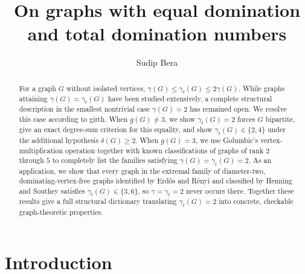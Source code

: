 \documentclass[12pt]{amsart}
\title{}
\theoremstyle{plain}
\newtheorem{theorem}{Theorem}[section]
\theoremstyle{definition}
\begin{document}
\title[On graphs with equal domination and total domination numbers]{On graphs with equal domination and total domination numbers}
\author[Sudip Bera]{Sudip Bera}
\address[Sudip Bera]{Faculty of Mathematics, Dhirubhai Ambani University, 
Gandhinagar, Gujarat, India}





\begin{abstract}
For a graph $G$ without isolated vertices, $\gamma(G)\le\gamma_t(G)\le 2\gamma(G)$. While graphs attaining $\gamma(G)=\gamma_t(G)$ have been studied extensively, a complete structural description in the smallest nontrivial case $\gamma(G)=2$ has remained open. We resolve this case according to girth. When $g(G)\ne 3$, we show $\gamma_t(G)=2$ forces $G$ bipartite, give an exact degree-sum criterion for this equality, and show $\gamma_t(G)\in\{2,4\}$ under the additional hypothesis $\delta(G)\ge 2$. When $g(G)=3$, we use Golumbic's vertex-multiplication operation together with known classifications of graphs of rank $2$ through $5$ to completely list the families satisfying $\gamma(G)=\gamma_t(G)=2$. As an application, we show that every graph in the extremal family of diameter-two, dominating-vertex-free graphs identified by Erd\H{o}s and R\'enyi and classified by Henning and Southey satisfies $\gamma_t(G)\in\{3,6\}$, so $\gamma=\gamma_t=2$ never occurs there. Together these results give a full structural dictionary translating $\gamma_t(G)=2$ into concrete, checkable graph-theoretic properties.
\end{abstract}



\maketitle	

\section{Introduction}
\end{document}
